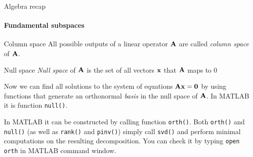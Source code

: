 \documentclass{beamer}
\begin{document}
\begin{frame}{Algebra recap}
\framesubtitle{Fundamental subspaces}
\begin{flushleft}

\begin{block}{Column space}
All possible outputs of a linear operator $\mathbf{A}$ are called \emph{column space} of $\mathbf{A}$. 
\end{block}

\begin{block}{Null space}
  \emph{Null space} of $\mathbf{A}$ is the set of all vectors $\mathbf{x}$ that $\mathbf{A}$ maps to $0$
\end{block}

Now we can find all solutions to the system of equations $\mathbf{A} \mathbf{x} = \mathbf{0}$ by using functions that generate an orthonormal \emph{basis} in the null space of $\mathbf{A}$. In MATLAB it is function \texttt{null()}.

\bigskip

In MATLAB it can be constructed by calling function \texttt{orth()}. Both \texttt{orth()} and \texttt{null()} (as well as \texttt{rank()} and \texttt{pinv()}) simply call \texttt{svd()} and perform minimal computations on the resulting decomposition. You can check it by typing \texttt{open orth} in MATLAB command window.

\end{flushleft}
\end{frame}
\end{document}
